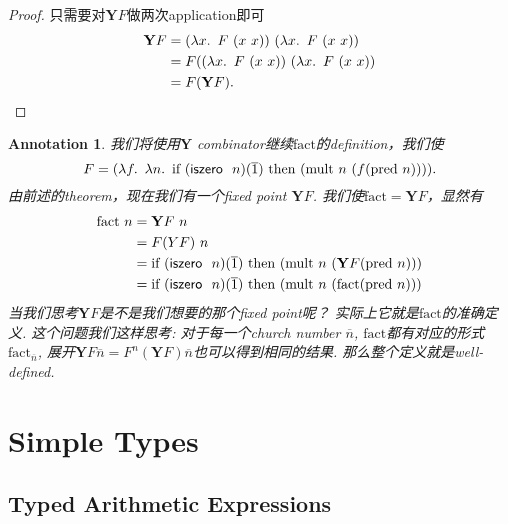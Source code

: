 \documentclass{article}
\theoremstyle{plain}
\newtheorem{annotation}[theorem]{Annotation}
\theoremstyle{nonumberplain}
\newtheorem{proof}{Proof}
\newcommand{\lam}[2]{\ensuremath{\lambda #1\ldotp~ #2}} %
\newcommand{\term}[1]{\ensuremath\mathsf{#1}}
\newcommand{\iszero}[1]{\term{iszero}~#1}
\begin{document}
\begin{proof}
只需要对$\mathbf{Y}F$做两次application即可
$$
\begin{aligned}
\mathbf{Y}F &= (\lam{x}{F~(x~x)})~(\lam{x}{F~(x~x)}) \\
&= F((\lam{x}{F~(x~x)})~(\lam{x}{F~(x~x)}) \\
&= F(\mathbf{Y}F). 
\end{aligned}
$$
\end{proof}

\begin{annotation}
\rm 我们将使用$\mathbf{Y}$ combinator继续$\text{fact}$的definition，我们使\[F = (\lam{f}{\lam{n}{\text{if}~(\iszero~n)(\overline{1})~\text{then}~(\text{mult}~n~(f(\text{pred}~n)))}}).\]由前述的theorem，现在我们有一个fixed point $\mathbf{Y}F$. 我们使$\text{fact} = \mathbf{Y}F$，显然有
$$
\begin{aligned}
\text{fact}~n &= \mathbf{Y}F~n \\
&= F({Y}F)~n \\
&= \text{if}~(\iszero~n)(\overline{1})~\text{then}~(\text{mult}~n~(\mathbf{Y}F(\text{pred}~n))) \\
&= \text{if}~(\iszero~n)(\overline{1})~\text{then}~(\text{mult}~n~(\text{fact}(\text{pred}~n))) 
\end{aligned}
$$
当我们思考$\mathbf{Y}F$是不是我们想要的那个fixed point呢？ 实际上它就是$\text{fact}$的准确定义. 这个问题我们这样思考: 对于每一个church number $\overline{n}$, $\text{fact}$都有对应的形式$\text{fact}_{\overline{n}}$, 展开$\mathbf{Y}F \overline{n} = F^n(\mathbf{Y}F) \overline{n}$也可以得到相同的结果. 那么整个定义就是well-defined. 
\end{annotation}

\newpage
\section{Simple Types}

\subsection{Typed Arithmetic Expressions}
\end{document}
